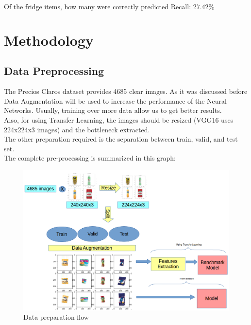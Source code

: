 \documentclass[a4paper,10pt]{article}
\begin{document}
Of the fridge items, how many were correctly predicted
Recall: 27.42\% \\

\noindent{}

\section{Methodology}

\subsection{Data Preprocessing}

The Precios Claros dataset provides 4685 clear images. As it was discussed before Data Augmentation will be used to increase the performance of the Neural Networks. Usually, training over more data allow us to get better results. \\

Also, for using Transfer Learning, the images should be resized (VGG16 uses 224x224x3 images) and the bottleneck extracted. \\

The other preparation required is the separation between train, valid, and test set. \\

The complete pre-processing is summarized in this graph: 
  
\begin{figure}[ht]
  \includegraphics[width=\linewidth]{data_processing.png}
  \caption{Data preparation flow}
\end{figure}
\end{document}
